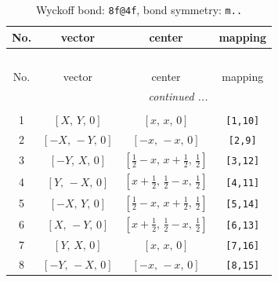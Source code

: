 \documentclass[fleqn,8pt]{jsarticle}
\begin{document}
\begin{longtable}{cccc}
\caption{Wyckoff bond: {\tt 8f@4f}, bond symmetry: {\tt m..}}
 \\
 \hline \hline
No. & vector & center & mapping \\ \hline \endfirsthead

\multicolumn{3}{l}{\tablename\ \thetable{}} \\
 \hline \hline
No. & vector & center & mapping \\ \hline \endhead

 \hline \hline
\multicolumn{3}{r}{\footnotesize\it continued ...} \\ \endfoot

 \hline \hline
\multicolumn{3}{r}{} \\ \endlastfoot

1 & $\left[ X,\, Y,\, 0 \right]$ & $\left[ x,\, x,\, 0 \right]$ & {\tt [1,10]} \\ \hline
2 & $\left[ - X,\, - Y,\, 0 \right]$ & $\left[ - x,\, - x,\, 0 \right]$ & {\tt [2,9]} \\ \hline
3 & $\left[ - Y,\, X,\, 0 \right]$ & $\left[ \frac{1}{2} - x,\, x + \frac{1}{2},\, \frac{1}{2} \right]$ & {\tt [3,12]} \\ \hline
4 & $\left[ Y,\, - X,\, 0 \right]$ & $\left[ x + \frac{1}{2},\, \frac{1}{2} - x,\, \frac{1}{2} \right]$ & {\tt [4,11]} \\ \hline
5 & $\left[ - X,\, Y,\, 0 \right]$ & $\left[ \frac{1}{2} - x,\, x + \frac{1}{2},\, \frac{1}{2} \right]$ & {\tt [5,14]} \\ \hline
6 & $\left[ X,\, - Y,\, 0 \right]$ & $\left[ x + \frac{1}{2},\, \frac{1}{2} - x,\, \frac{1}{2} \right]$ & {\tt [6,13]} \\ \hline
7 & $\left[ Y,\, X,\, 0 \right]$ & $\left[ x,\, x,\, 0 \right]$ & {\tt [7,16]} \\ \hline
8 & $\left[ - Y,\, - X,\, 0 \right]$ & $\left[ - x,\, - x,\, 0 \right]$ & {\tt [8,15]} \\
\end{longtable}
\renewcommand{\arraystretch}{1.2}
\end{document}
